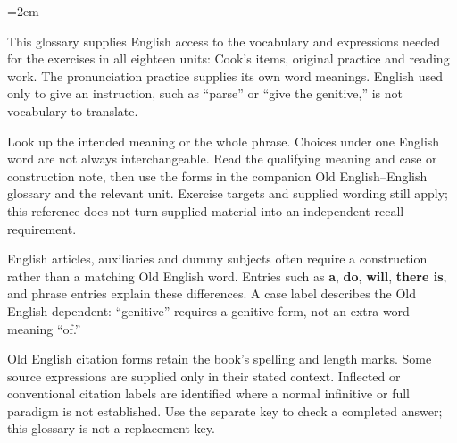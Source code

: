 \BookRecto
\begingroup
\renewcommand{\runningtitle}{English–Old English}
\raggedcolumns
\newcommand{\needspace}[1]{\par\begingroup\skip0=\lastskip\vskip-\skip0\dimen0=#1\relax\advance\dimen0 by\skip0\vskip0pt plus\dimen0\penalty-100\vskip0pt plus-\dimen0\vskip\dimen0\penalty9999\vskip-\dimen0\vskip\skip0\endgroup}
\setlength{\columnsep}{6mm}
\emergencystretch=2em

\raggedright
This glossary supplies English access to the vocabulary and expressions needed for the exercises in all eighteen units: Cook's items, original practice and reading work. The pronunciation practice supplies its own word meanings. English used only to give an instruction, such as “parse” or “give the genitive,” is not vocabulary to translate.\par
Look up the intended meaning or the whole phrase. Choices under one English word are not always interchangeable. Read the qualifying meaning and case or construction note, then use the forms in the companion Old English–English glossary and the relevant unit. Exercise targets and supplied wording still apply; this reference does not turn supplied material into an independent-recall requirement.\par
English articles, auxiliaries and dummy subjects often require a construction rather than a matching Old English word. Entries such as \textbf{a}, \textbf{do}, \textbf{will}, \textbf{there is}, and phrase entries explain these differences. A case label describes the Old English dependent: “genitive” requires a genitive form, not an extra word meaning “of.”\par
Old English citation forms retain the book's spelling and length marks. Some source expressions are supplied only in their stated context. Inflected or conventional citation labels are identified where a normal infinitive or full paradigm is not established. Use the separate key to check a completed answer; this glossary is not a replacement key.\par
